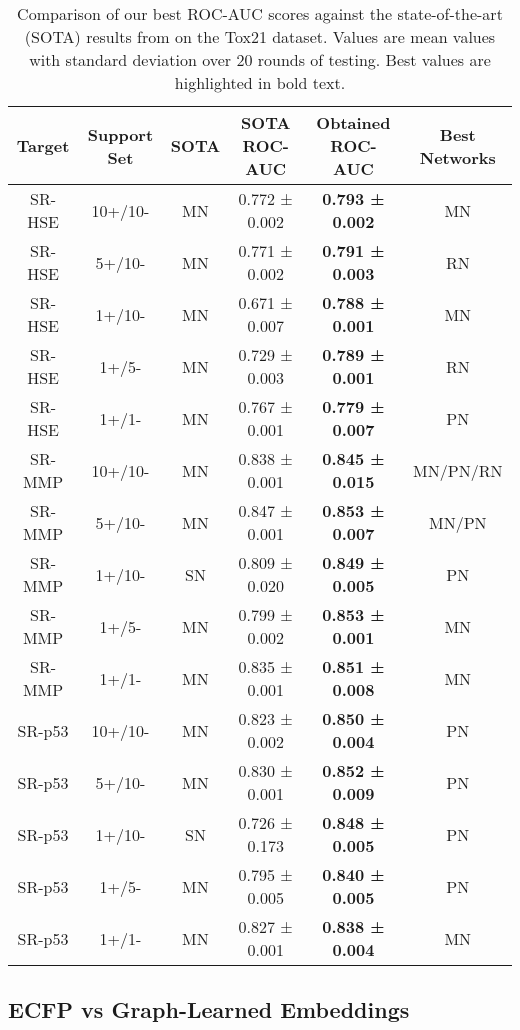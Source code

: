 \begin{table}[ht]
    \centering
    \begin{tabular}{@{}cccccc@{}}
    \hline
    \textbf{Target} & \textbf{Support Set} & \textbf{SOTA} & \textbf{SOTA ROC-AUC} & \textbf{Obtained ROC-AUC} & \textbf{Best Networks} \\
    \hline  
    SR-HSE & 10+/10- & MN & 0.772 ± 0.002 & \textbf{0.793 ± 0.002} & MN \\
    SR-HSE & 5+/10- & MN & 0.771 ± 0.002 & \textbf{0.791 ± 0.003} & RN \\
    SR-HSE & 1+/10- & MN & 0.671 ± 0.007 & \textbf{0.788 ± 0.001} & MN \\
    SR-HSE & 1+/5- & MN & 0.729 ± 0.003 & \textbf{0.789 ± 0.001} & RN \\
    SR-HSE & 1+/1- & MN & 0.767 ± 0.001 & \textbf{0.779 ± 0.007} & PN \\
    SR-MMP & 10+/10- & MN & 0.838 ± 0.001 & \textbf{0.845 ± 0.015} & MN/PN/RN \\
    SR-MMP & 5+/10- & MN & 0.847 ± 0.001 & \textbf{0.853 ± 0.007} & MN/PN \\
    SR-MMP & 1+/10- & SN & 0.809 ± 0.020 & \textbf{0.849 ± 0.005} & PN \\
    SR-MMP & 1+/5- & MN & 0.799 ± 0.002 & \textbf{0.853 ± 0.001} & MN \\
    SR-MMP & 1+/1- & MN & 0.835 ± 0.001 & \textbf{0.851 ± 0.008} & MN \\
    SR-p53 & 10+/10- & MN & 0.823 ± 0.002 & \textbf{0.850 ± 0.004} & PN \\
    SR-p53 & 5+/10- & MN & 0.830 ± 0.001 & \textbf{0.852 ± 0.009} & PN \\
    SR-p53 & 1+/10- & SN & 0.726 ± 0.173 & \textbf{0.848 ± 0.005} & PN \\
    SR-p53 & 1+/5- & MN & 0.795 ± 0.005 & \textbf{0.840 ± 0.005} & PN \\
    SR-p53 & 1+/1- & MN & 0.827 ± 0.001 & \textbf{0.838 ± 0.004} & MN \\
    \hline  
    \end{tabular}
    \caption[Comparing our best ROC-AUC scores with the SOTA results on Tox21.]{Comparison of our best ROC-AUC scores against the state-of-the-art (SOTA) results from \citet{altae2017low} on the Tox21 dataset. Values are mean values with standard deviation over 20 rounds of testing. Best values are highlighted in bold text.}
    \label{table:Tox21-sota-ours}
\end{table}

\subsection{ECFP vs Graph-Learned Embeddings}

